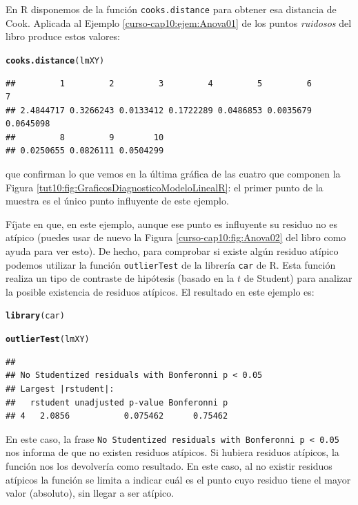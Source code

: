 \documentclass[10pt,a4paper]{article}\usepackage[]{graphicx}\usepackage[]{color}
\makeatletter
\newcommand{\hlstd}[1]{\textcolor[rgb]{0.345,0.345,0.345}{#1}}%
\newcommand{\hlkwd}[1]{\textcolor[rgb]{0.737,0.353,0.396}{\textbf{#1}}}%
\newenvironment{kframe}{%
 \def\at@end@of@kframe{}%
 \ifinner\ifhmode%
  \def\at@end@of@kframe{\end{minipage}}%
  \begin{minipage}{\columnwidth}%
 \fi\fi%
 \def\FrameCommand##1{\hskip\@totalleftmargin \hskip-\fboxsep
 \colorbox{shadecolor}{##1}\hskip-\fboxsep
     \hskip-\linewidth \hskip-\@totalleftmargin \hskip\columnwidth}%
 \MakeFramed {\advance\hsize-\width
   \@totalleftmargin\z@ \linewidth\hsize
   \@setminipage}}%
 {\par\unskip\endMakeFramed%
 \at@end@of@kframe}
\newenvironment{knitrout}{}{} %
\newcounter {cont01}
\makeatother
\begin{document}
En R disponemos de la función {\tt cooks.distance} para obtener esa distancia de Cook. Aplicada al Ejemplo \ref{curso-cap10:ejem:Anova01} de los puntos {\em ruidosos} del libro produce estos valores:
\begin{knitrout}
\color{fgcolor}\begin{kframe}
\begin{alltt}
\hlkwd{cooks.distance}\hlstd{(lmXY)}
\end{alltt}
\begin{verbatim}
##         1         2         3         4         5         6         7 
## 2.4844717 0.3266243 0.0133412 0.1722289 0.0486853 0.0035679 0.0645098 
##         8         9        10 
## 0.0250655 0.0826111 0.0504299
\end{verbatim}
\end{kframe}
\end{knitrout}
que confirman lo que vemos en la última gráfica de las cuatro que componen la Figura \ref{tut10:fig:GraficosDiagnosticoModeloLinealR}: el primer punto de la muestra es el único punto influyente de este ejemplo.

Fíjate en que, en este ejemplo, aunque ese punto es influyente su residuo no es atípico (puedes usar de nuevo la Figura \ref{curso-cap10:fig:Anova02} del libro como ayuda para ver esto).  De hecho, para comprobar si existe algún residuo atípico podemos utilizar la función {\tt outlierTest} de la librería {\tt car} de R.  Esta función realiza un tipo de contraste de hipótesis (basado en la $t$ de Student) para analizar la posible existencia de residuos atípicos. El resultado en este ejemplo es:
\begin{knitrout}
\color{fgcolor}\begin{kframe}
\begin{alltt}
\hlkwd{library}\hlstd{(car)}
\end{alltt}


{\ttfamily\noindent\itshape\color{messagecolor}{\#\# \\\#\# Attaching package: 'car'}}

{\ttfamily\noindent\itshape\color{messagecolor}{\#\# The following object is masked from 'package:gtools':\\\#\# \\\#\#\ \ \ \  logit}}\begin{alltt}
\hlkwd{outlierTest}\hlstd{(lmXY)}
\end{alltt}
\begin{verbatim}
## 
## No Studentized residuals with Bonferonni p < 0.05
## Largest |rstudent|:
##   rstudent unadjusted p-value Bonferonni p
## 4   2.0856           0.075462      0.75462
\end{verbatim}
\end{kframe}
\end{knitrout}
En este caso, la frase {\tt No Studentized residuals with Bonferonni p < 0.05} nos informa de que no existen residuos atípicos. Si hubiera residuos atípicos, la función nos los devolvería como resultado. En este caso, al no existir residuos atípicos la función se limita a indicar cuál es el punto cuyo residuo tiene el mayor valor (absoluto), sin llegar a ser atípico.
\end{document}
